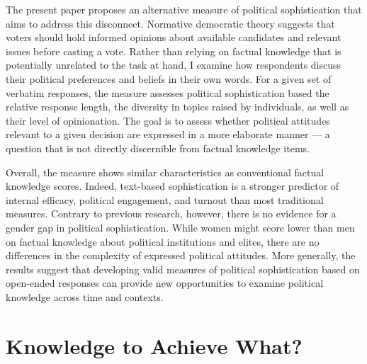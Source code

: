 \documentclass[12pt]{article}
\begin{document}
The present paper proposes an alternative measure of political sophistication that aims to address this disconnect. Normative democratic theory suggests that voters should hold informed opinions about available candidates and relevant issues before casting a vote. Rather than relying on factual knowledge that is potentially unrelated to the task at hand, I examine how respondents discuss their political preferences and beliefs in their own words. For a given set of verbatim responses, the measure assesses political sophistication based the relative response length, the diversity in topics raised by individuals, as well as their level of opinionation. The goal is to assess whether political attitudes relevant to a given decision are expressed in a more elaborate manner --- a question that is not directly discernible from factual knowledge items. %

Overall, the measure shows similar characteristics as conventional factual knowledge scores. Indeed, text-based sophistication is a stronger predictor of internal efficacy, political engagement, and turnout than most traditional measures. Contrary to previous research, however, there is no evidence for a gender gap in political sophistication. While women might score lower than men on factual knowledge about political institutions and elites, there are no differences in the complexity of expressed political attitudes. More generally, the results suggest that developing valid measures of political sophistication based on open-ended responses can provide new opportunities to examine political knowledge across time and contexts. 


\section*{Knowledge to Achieve What?}
\end{document}
